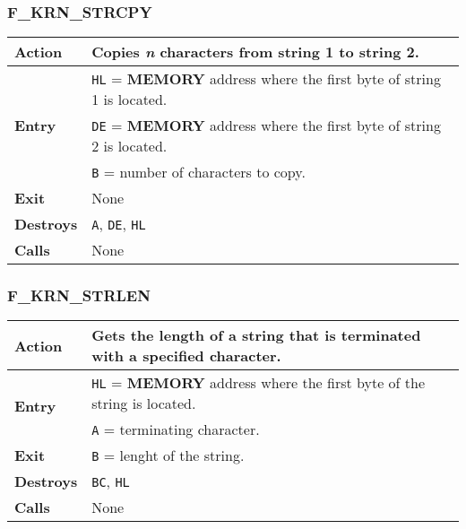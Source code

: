     \subsubsection{F\_KRN\_STRCPY}
    \label{func:fkrnstrcpy}
    \begin{tabular}{l p{9cm}}
        \hline\textbf{Action}
        & Copies \textit{n} characters from string 1 to string 2.\\
        \hline\multirow[t]{3}{4em}{\textbf{Entry}}
        & \texttt{HL} = \textbf{MEMORY} address where the first byte of
        string 1 is located.\\
        & \texttt{DE} = \textbf{MEMORY} address where the first byte of
        string 2 is located.\\
        & \texttt{B} = number of characters to copy.\\
        \hline\textbf{Exit} & None\\
        \hline\textbf{Destroys} & \texttt{A}, \texttt{DE}, \texttt{HL}\\
        \hline\textbf{Calls} & None\\
        \hline
    \end{tabular}

    \subsubsection{F\_KRN\_STRLEN}
    \label{func:fkrnstrlen}
    \begin{tabular}{l p{9cm}}
        \hline\textbf{Action}
        & Gets the length of a string that is terminated with a specified
        character.\\
        \hline\multirow[t]{2}{4em}{\textbf{Entry}}
        & \texttt{HL} = \textbf{MEMORY} address where the first byte of the
        string is located.\\
        & \texttt{A} = terminating character.\\
        \hline\textbf{Exit} & \texttt{B} = lenght of the string.\\
        \hline\textbf{Destroys} & \texttt{BC}, \texttt{HL}\\
        \hline\textbf{Calls} & None\\
        \hline
    \end{tabular}

